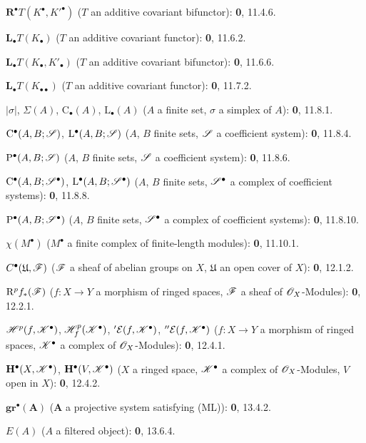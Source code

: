 \begin{flushleft}
$\mathbf{R}^\bullet T(K^\bullet,K'^{\bullet})$ ($T$ an additive covariant
bifunctor): \textbf{0}, 11.4.6.

$\mathbf{L}_\bullet T(K_\bullet)$ ($T$ an additive covariant functor): \textbf{0}, 11.6.2.

$\mathbf{L}_\bullet T(K_\bullet,K'_\bullet)$ ($T$ an additive covariant
bifunctor): \textbf{0}, 11.6.6.

$\mathbf{L}_\bullet T(K_{\bullet\bullet})$ ($T$ an additive covariant functor):
\textbf{0}, 11.7.2.

$|\sigma|$, $\Sigma(A)$, $\mathrm C_\bullet(A)$, $\mathrm L_\bullet(A)$
($A$ a finite set, $\sigma$ a simplex of $A$): \textbf{0}, 11.8.1.

$\mathrm C^\bullet(A,B;\mathscr{S})$, $\mathrm L^\bullet(A,B;\mathscr{S})$
($A$, $B$ finite sets, $\mathscr{S}$ a coefficient system): \textbf{0}, 11.8.4.

$\mathrm P^\bullet(A,B;\mathscr{S})$ ($A$, $B$ finite sets, $\mathscr{S}$ a
coefficient system): \textbf{0}, 11.8.6.

$\mathrm C^\bullet(A,B;\mathscr{S}^\bullet)$,
$\mathrm L^\bullet(A,B;\mathscr{S}^\bullet)$ ($A$, $B$ finite sets,
$\mathscr{S}^\bullet$ a complex of coefficient systems): \textbf{0}, 11.8.8.

$\mathrm P^\bullet(A,B;\mathscr{S}^\bullet)$ ($A$, $B$ finite sets,
$\mathscr{S}^\bullet$ a complex of coefficient systems): \textbf{0}, 11.8.10.

$\chi(M^\bullet)$ ($M^\bullet$ a finite complex of finite-length modules):
\textbf{0}, 11.10.1.

$C^\bullet(\mathfrak U,\mathscr{F})$ ($\mathscr{F}$ a sheaf of abelian groups
on $X$, $\mathfrak U$ an open cover of $X$): \textbf{0}, 12.1.2.

$\mathrm{R}^p f_*(\mathscr{F})$ ($f:X\to Y$ a morphism of ringed spaces,
$\mathscr{F}$ a sheaf of $\mathscr{O}_X$-Modules): \textbf{0}, 12.2.1.

$\mathscr{H}^p(f,\mathscr{K}^\bullet)$,
$\mathscr{H}^p_f(\mathscr{K}^\bullet)$, ${}'\mathcal E(f,\mathscr{K}^\bullet)$,
${}''\mathcal E(f,\mathscr{K}^\bullet)$ ($f:X\to Y$ a morphism of ringed spaces,
$\mathscr{K}^\bullet$ a complex of $\mathscr{O}_X$-Modules): \textbf{0}, 12.4.1.

$\mathbf H^\bullet(X,\mathscr{K}^\bullet)$,
$\mathbf H^\bullet(V,\mathscr{K}^\bullet)$ ($X$ a ringed space,
$\mathscr{K}^\bullet$ a complex of $\mathscr{O}_X$-Modules, $V$ open in $X$):
\textbf{0}, 12.4.2.

$\mathbf{gr}^\bullet(\mathbf{A})$ ($\mathbf{A}$ a projective system satisfying (ML)):
\textbf{0}, 13.4.2.

$E(A)$ ($A$ a filtered object): \textbf{0}, 13.6.4.


\end{flushleft}
